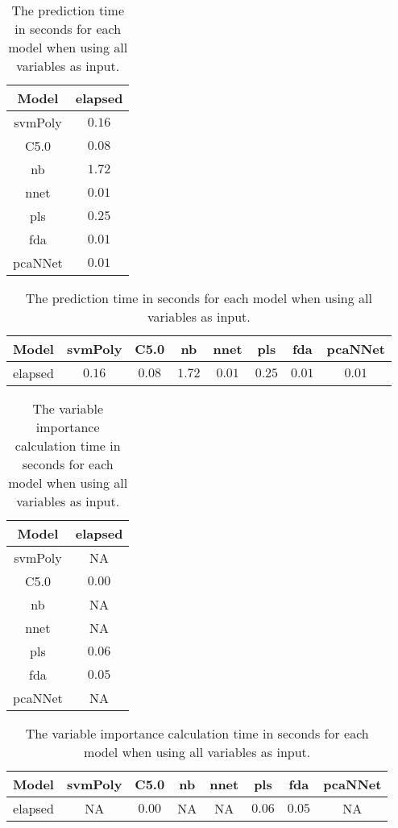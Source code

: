 \begin{table}[!ht]
	\centering
	\begin{tabular}{|c|c|}
		\hline
		Model & elapsed \\ \hline
		svmPoly & $0.16$ \\ \hline
		C5.0 & $0.08$ \\ \hline
		nb & $1.72$ \\ \hline
		nnet & $0.01$ \\ \hline
		pls & $0.25$ \\ \hline
		fda & $0.01$ \\ \hline
		pcaNNet & $0.01$ \\ \hline
	\end{tabular}
	\caption{The prediction time in seconds for each model when using all variables as input.}
	\label{tab:time:all:predict}
\end{table}

\begin{table}[!ht]
	\centering
	\begin{tabular}{|c|c|c|c|c|c|c|c|}
		\hline
		Model & svmPoly & C5.0 & nb & nnet & pls & fda & pcaNNet \\ \hline
		elapsed & $0.16$ & $0.08$ & $1.72$ & $0.01$ & $0.25$ & $0.01$ & $0.01$ \\ \hline
	\end{tabular}
	\caption{The prediction time in seconds for each model when using all variables as input.}
	\label{tab:time:reverse:all:predict}
\end{table}

\begin{table}[!ht]
	\centering
	\begin{tabular}{|c|c|}
		\hline
		Model & elapsed \\ \hline
		svmPoly & NA \\ \hline
		C5.0 & $0.00$ \\ \hline
		nb & NA \\ \hline
		nnet & NA \\ \hline
		pls & $0.06$ \\ \hline
		fda & $0.05$ \\ \hline
		pcaNNet & NA \\ \hline
	\end{tabular}
	\caption{The variable importance calculation time in seconds for each model when using all variables as input.}
	\label{tab:time:all:importance}
\end{table}

\begin{table}[!ht]
	\centering
	\begin{tabular}{|c|c|c|c|c|c|c|c|}
		\hline
		Model & svmPoly & C5.0 & nb & nnet & pls & fda & pcaNNet \\ \hline
		elapsed & NA & $0.00$ & NA & NA & $0.06$ & $0.05$ & NA \\ \hline
	\end{tabular}
	\caption{The variable importance calculation time in seconds for each model when using all variables as input.}
	\label{tab:time:reverse:all:importance}
\end{table}


